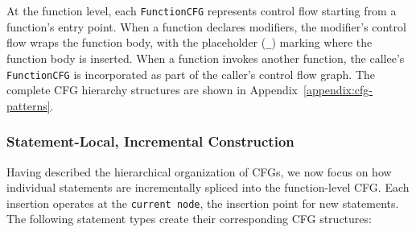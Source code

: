 \documentclass[pdflatex,sn-basic]{sn-jnl}%
\theoremstyle{thmstyleone}%
\theoremstyle{thmstyletwo}%
\theoremstyle{thmstylethree}%
\begin{document}
At the function level, each \texttt{FunctionCFG} represents control flow starting from a function's entry point.
When a function declares modifiers, the modifier's control flow wraps the function body, with the placeholder (\texttt{\_}) marking where the function body is inserted.
When a function invokes another function, the callee's \texttt{FunctionCFG} is incorporated as part of the caller's control flow graph.
The complete CFG hierarchy structures are shown in Appendix~\ref{appendix:cfg-patterns}.

\subsubsection{Statement-Local, Incremental Construction}

Having described the hierarchical organization of CFGs, we now focus on how individual statements are incrementally spliced into the function-level CFG.
Each insertion operates at the \texttt{current node}, the insertion point for new statements.
The following statement types create their corresponding CFG structures:
\end{document}
